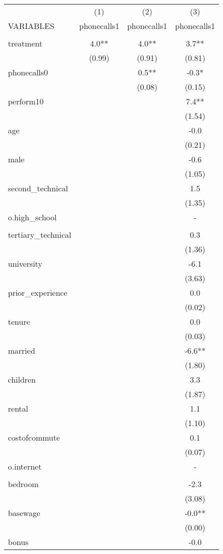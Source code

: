 \documentclass[]{article}
\begin{document}
\begin{tabular}{lccc} \hline
 & (1) & (2) & (3) \\
VARIABLES & phonecalls1 & phonecalls1 & phonecalls1 \\ \hline
 &  &  &  \\
treatment & 4.0** & 4.0** & 3.7** \\
 & (0.99) & (0.91) & (0.81) \\
phonecalls0 &  & 0.5** & -0.3* \\
 &  & (0.08) & (0.15) \\
perform10 &  &  & 7.4** \\
 &  &  & (1.54) \\
age &  &  & -0.0 \\
 &  &  & (0.21) \\
male &  &  & -0.6 \\
 &  &  & (1.05) \\
second\_technical &  &  & 1.5 \\
 &  &  & (1.35) \\
o.high\_school &  &  & - \\
 &  &  &  \\
tertiary\_technical &  &  & 0.3 \\
 &  &  & (1.36) \\
university &  &  & -6.1 \\
 &  &  & (3.63) \\
prior\_experience &  &  & 0.0 \\
 &  &  & (0.02) \\
tenure &  &  & 0.0 \\
 &  &  & (0.03) \\
married &  &  & -6.6** \\
 &  &  & (1.80) \\
children &  &  & 3.3 \\
 &  &  & (1.87) \\
rental &  &  & 1.1 \\
 &  &  & (1.10) \\
costofcommute &  &  & 0.1 \\
 &  &  & (0.07) \\
o.internet &  &  & - \\
 &  &  &  \\
bedroom &  &  & -2.3 \\
 &  &  & (3.08) \\
basewage &  &  & -0.0** \\
 &  &  & (0.00) \\
bonus &  &  & -0.0 \\

\end{tabular}
\end{document}
